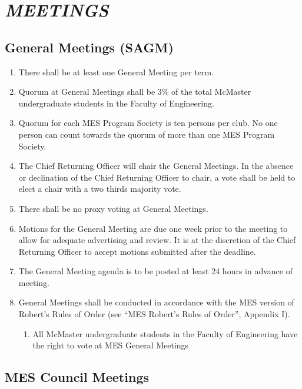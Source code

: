 \section{\texorpdfstring{\emph{MEETINGS}}{MEETINGS}}
\label{meetings}

\subsection{General Meetings (SAGM)}
\label{general-meetings-sagm}
\begin{enumerate}
 \item
  There shall be at least one General Meeting per term.
 \item
  Quorum at General Meetings shall be 3\% of the total McMaster
  undergraduate students in the Faculty of Engineering.
 \item
  Quorum for each MES Program Society is ten persons per club. No one
  person can count towards the quorum of more than one MES Program
  Society.
 \item
  The Chief Returning Officer will chair the General Meetings. In the
  absence or declination of the Chief Returning Officer to chair, a vote
  shall be held to elect a chair with a two thirds majority vote.
 \item
  There shall be no proxy voting at General Meetings.
 \item
  Motions for the General Meeting are due one week prior to the meeting
  to allow for adequate advertising and review. It is at the discretion
  of the Chief Returning Officer to accept motions submitted after the
  deadline.
 \item
  The General Meeting agenda is to be posted at least 24 hours in
  advance of meeting.
 \item
  General Meetings shall be conducted in accordance with the MES version
  of Robert's Rules of Order (see ``MES Robert's Rules of Order'',
  Appendix I).

  \begin{enumerate}
   \item
    All McMaster undergraduate students in the Faculty of Engineering
    have the right to vote at MES General Meetings
  \end{enumerate}
\end{enumerate}

\subsection{MES Council Meetings}
\label{mes-council-meetings}

